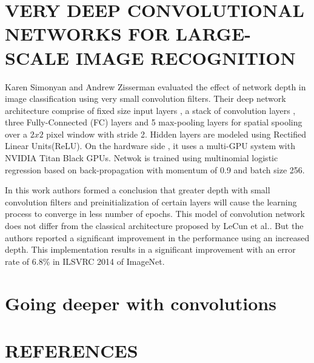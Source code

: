 \documentclass{article}
\begin{document}
\section{VERY DEEP CONVOLUTIONAL NETWORKS FOR LARGE-SCALE IMAGE RECOGNITION}
Karen Simonyan and Andrew Zisserman \cite{Arge2015} evaluated the effect of network depth in image classification using very small convolution filters. Their deep network architecture comprise of fixed  size input layers , a stack of convolution layers , three Fully-Connected (FC) layers and  5 max-pooling layers for spatial spooling  over a $2 x 2$ pixel window with stride 2. Hidden layers are modeled using Rectified Linear Units(ReLU)\cite{Nair2010}. On the hardware side , it uses a multi-GPU system with NVIDIA Titan Black GPUs. Netwok is trained using multinomial logistic regression  based on back-propagation with momentum of 0.9 and  batch size  256.
\par
 In this work authors formed a conclusion that greater depth with small convolution filters and  preinitialization of certain layers will cause the learning process to converge in less number  of epochs. This model of convolution network does not differ from the classical architecture proposed by  LeCun et al.\cite{LeCun1998}. But the authors reported a significant improvement in the performance using an increased depth.  This implementation results in a significant improvement with  an error rate of  6.8\% in  ILSVRC 2014 of ImageNet.

\section{Going deeper with convolutions }



\section{REFERENCES}
\label{sec:survey}


\end{document}
